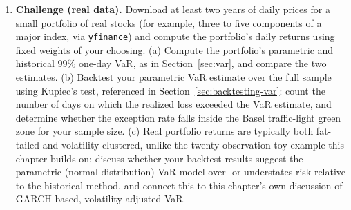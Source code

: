 \documentclass[../ai_in_finance]{subfiles}
\begin{document}
\begin{enumerate}[exercises]
    \item \textbf{Challenge (real data).} Download at least two years of daily prices for a small portfolio of real stocks (for example, three to five components of a major index, via \texttt{yfinance}) and compute the portfolio's daily returns using fixed weights of your choosing. (a) Compute the portfolio's parametric and historical $99\%$ one-day VaR, as in Section~\ref{sec:var}, and compare the two estimates. (b) Backtest your parametric VaR estimate over the full sample using Kupiec's test, referenced in Section~\ref{sec:backtesting-var}: count the number of days on which the realized loss exceeded the VaR estimate, and determine whether the exception rate falls inside the Basel traffic-light green zone for your sample size. (c) Real portfolio returns are typically both fat-tailed and volatility-clustered, unlike the twenty-observation toy example this chapter builds on; discuss whether your backtest results suggest the parametric (normal-distribution) VaR model over- or understates risk relative to the historical method, and connect this to this chapter's own discussion of GARCH-based, volatility-adjusted VaR.
\end{enumerate}

\end{document}
